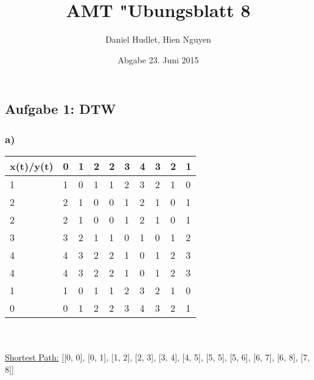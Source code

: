 \documentclass{article}
\title{AMT "Ubungsblatt 8}
\author{Daniel Hudlet, Hien Nguyen}
\date{Abgabe 23. Juni 2015}
\begin{document}
\maketitle

\subsection*{Aufgabe 1: DTW}
\subsubsection*{a)}
\begin{tabular}{l|lllllllll}
x(t)/y(t) & 0 & 1 & 2 & 2 & 3 & 4 & 3 & 2 & 1\\ \hline
1 & \cellcolor[HTML]{EFEFEF} 1 & \cellcolor[HTML]{EFEFEF} 0 & 1 & 1 & 2 & 3 & 2 & 1 & 0\\
2 & 2 & 1 & \cellcolor[HTML]{EFEFEF} 0 & 0 & 1 & 2 & 1 & 0 & 1\\
2 & 2 & 1 & 0 & \cellcolor[HTML]{EFEFEF} 0 & 1 & 2 & 1 & 0 & 1\\
3 & 3 & 2 & 1 & 1 & \cellcolor[HTML]{EFEFEF} 0 & 1 & 0 & 1 & 2\\
4 & 4 & 3 & 2 & 2 & 1 & \cellcolor[HTML]{EFEFEF} 0 & 1 & 2 & 3\\
4 & 4 & 3 & 2 & 2 & 1 & \cellcolor[HTML]{EFEFEF} 0 & \cellcolor[HTML]{EFEFEF} 1 & 2 & 3\\
1 & 1 & 0 & 1 & 1 & 2 & 3 & 2 & \cellcolor[HTML]{EFEFEF} 1 & \cellcolor[HTML]{EFEFEF} 0\\
0 & 0 & 1 & 2 & 2 & 3 & 4 & 3 & 2 & \cellcolor[HTML]{EFEFEF} 1
\end{tabular}\\
\\
\underline{Shortest Path:}  [[0, 0], [0, 1], [1, 2], [2, 3], [3, 4], [4, 5], [5, 5], [5, 6], [6, 7], [6, 8], [7, 8]]
\end{document}
